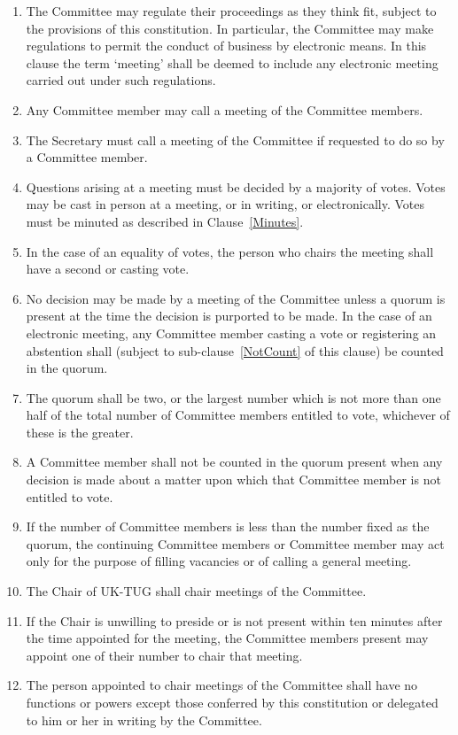 \documentclass[a4paper,11pt]{article}
\begin{document}
\begin{enumerate}
\item The Committee may regulate their proceedings as they think fit, subject to
  the provisions of this constitution. In particular, the Committee may make regulations
  to permit the conduct of business by electronic means. In this clause the term `meeting'
  shall be deemed to include any electronic meeting carried out under such regulations.
\item Any Committee member may call a meeting of the Committee members.
\item The Secretary must call a meeting of the Committee if requested to do so
  by a Committee member.
\item Questions arising at a meeting must be decided by a majority of votes. Votes may
  be cast in person at a meeting, or in writing, or electronically. Votes must be minuted
  as described in Clause~\ref{Minutes}.
\item In the case of an equality of votes, the person who chairs the meeting
  shall have a second or casting vote.
\item No decision may be made by a meeting of the Committee unless a quorum is
  present at the time the decision is purported to be made. In the case of an electronic
  meeting, any Committee member casting a vote or registering an abstention shall (subject
  to sub-clause~\ref{NotCount} of this clause) be counted in the quorum.
\item The quorum shall be two, or the largest number which is not more than one half of 
  the total number of Committee members entitled to vote, whichever of these is the greater.
\item \label{NotCount} A Committee member shall not be counted in the quorum present when any
  decision is made about a matter upon which that Committee member is not
  entitled to vote.
\item If the number of Committee members is less than the number fixed as the
  quorum, the continuing Committee members or Committee member may act only for
  the purpose of filling vacancies or of calling a general meeting.
\item The Chair of UK-TUG shall chair meetings of the Committee.
\item If the Chair is unwilling to preside or is not present within ten minutes
  after the time appointed for the meeting, the Committee members present may
  appoint one of their number to chair that meeting.
\item The person appointed to chair meetings of the Committee shall have no
  functions or powers except those conferred by this constitution or delegated
  to him or her in writing by the Committee.
\end{enumerate}
\end{document}
